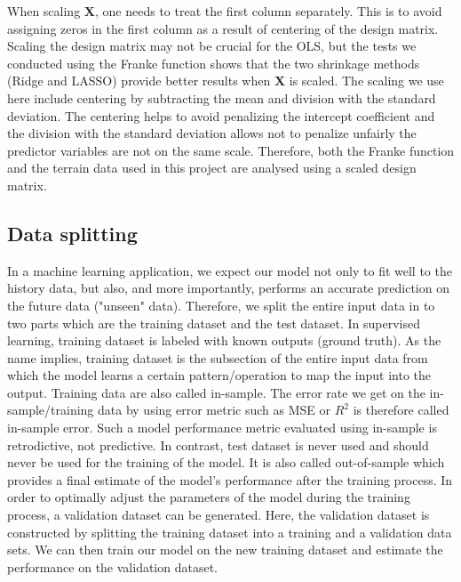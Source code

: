 \documentclass[a4paper]{article}
\begin{document}
When scaling $\mathbf{X}$, one needs to treat the first column separately. This is to avoid assigning zeros in the first column as a result of centering of the design matrix. Scaling the design matrix may not be crucial for the OLS, but the tests we conducted using the Franke function shows that the two shrinkage methods (Ridge and LASSO) provide better results when $\mathbf{X}$ is scaled. The scaling we use here include centering by subtracting the mean and division with the standard deviation. The centering helps to avoid penalizing the intercept coefficient and the division with the standard deviation allows not to penalize unfairly the predictor variables are not on the same scale. Therefore, both the Franke function and the terrain data used in this project are analysed using a scaled design matrix.

\subsection{Data splitting}
In a machine learning  application, we expect our model not only to fit well to the history data, but also, and more importantly, performs an accurate prediction on the future data ("unseen" data). Therefore, we split the entire input data in to two parts which are the training dataset and the test dataset. In supervised learning, training dataset is labeled with known outputs (ground truth). As the name implies, training dataset is the subsection of the entire input data from which the model learns a certain pattern/operation to map the input into the output. Training data are also called in-sample. The error rate we get on the in-sample/training data by using error metric such as MSE or $R^2$ is therefore called in-sample error. Such a model performance metric evaluated using in-sample is retrodictive, not predictive. In contrast, test dataset is never used and should never be used for the training of the model. It is also called out-of-sample which provides a final estimate of the model’s performance after the training process. In order to optimally adjust the parameters of the model during the training process, a validation dataset can be generated. Here, the validation dataset is constructed by splitting the training dataset into a training and a validation data sets. We can then train our model on the new training dataset and estimate the performance on the validation dataset. 
\end{document}
